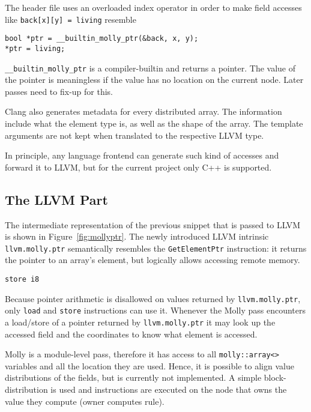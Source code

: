 \documentclass{sigplanconf}
\newcommand{\dquote}[1]{``#1''}
\begin{document}
The header file uses an overloaded index operator in order to make field accesses like \texttt{back[x][y] = living} resemble

\begin{verbatim}
bool *ptr = __builtin_molly_ptr(&back, x, y);
*ptr = living;
\end{verbatim}


\texttt{\_\_builtin\_molly\_ptr} is a compiler-builtin and returns a pointer. The value of the pointer is meaningless if the value has no location on the current node. Later passes need to fix-up for this.
  
Clang also generates metadata for every distributed array. The information include what the element type is, as well as the shape of the array. The template arguments are not kept when translated to the respective LLVM type. 

In principle, any language frontend can generate such kind of accesses and forward it to LLVM, but for the current project only C++ is supported.


\subsection{The LLVM Part}

The intermediate representation of the previous snippet that is passed to LLVM is shown in Figure~\ref{fig:mollyptr}. The newly introduced LLVM intrinsic \texttt{llvm.molly.ptr} semantically resembles the \texttt{GetElementPtr} instruction: it returns the pointer to an array's element, but logically allows accessing remote memory.

\begin{figure*}
\begin{verbatim}
store i8 \end{verbatim}
\caption{Equivalent LLVM IR code of \dquote{\texttt{back[x][y] = living}}}\label{fig:mollyptr}
\end{figure*}


Because pointer arithmetic is disallowed on values returned by \texttt{llvm.molly.ptr}, only \texttt{load} and \texttt{store} instructions can use it. Whenever the Molly pass encounters a load/store of a pointer returned by \texttt{llvm.molly.ptr} it may look up the accessed field and the coordinates to know what element is accessed.

Molly is a module-level pass, therefore it has access to all \texttt{molly::array<>} variables and all the location they are used. Hence, it is possible to align value distributions of the fields, but is currently not implemented. A simple block-distribution is used and instructions are executed on the node that owns the value they compute (owner computes rule).
\end{document}
